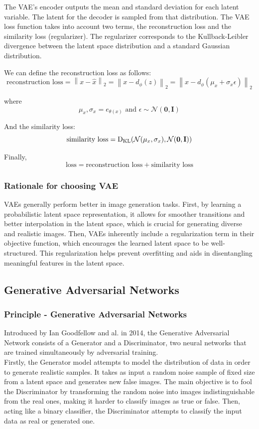 \documentclass{article}
\begin{document}
The VAE's encoder outputs the mean and standard deviation for each latent variable. The latent for the decoder is sampled from that distribution.
The VAE loss function takes into account two terms, the reconstruction loss and the similarity loss (regularizer). 
The regularizer corresponds to the Kullback-Leibler divergence between the latent space distribution and a standard Gaussian distribution.
  
We can define the reconstruction loss as follows:
$$\text{reconstruction loss} = \left\| x -\hat{x}\right\|_{2}=\left\| x-d_{\phi}(z) \right\|_{2}=\left\| x-d_{\phi}(\mu_{x}+\sigma_{x}\epsilon) \right\|_{2}$$

where
$$\mu_{x},\sigma_{x}=e_{\theta(x)} \text{ and } \epsilon\sim\mathcal{N}(\textbf{0},\textbf{I})$$


And the similarity loss:
$$\text{similarity loss}=\mathrm{D}_{\mathrm{KL}}(\mathcal{N}(\mu_{x},\sigma_{x}), \mathcal{N}(\textbf{0},\textbf{I})) \\$$

Finally,
$$\text{loss}=\text{reconstruction loss}+\text{similarity loss}$$

\subsubsection*{Rationale for choosing VAE}
VAEs generally perform better in image generation tasks. 
First, by learning a probabilistic latent space representation, it allows for smoother transitions and better interpolation in the latent space, which is crucial for generating diverse and realistic images. 
Then, VAEs inherently include a regularization term in their objective function, which encourages the learned latent space to be well-structured. 
This regularization helps prevent overfitting and aids in disentangling meaningful features in the latent space.


\subsection{Generative Adversarial Networks}
\subsubsection*{Principle - Generative Adversarial Networks}
\quad Introduced by Ian Goodfellow and al. in 2014, the Generative Adversarial Network consists of a Generator and a Discriminator, two neural networks that are trained simultaneously by adversarial training. \\
Firstly, the Generator model attempts to model the distribution of data in order to generate realistic samples. 
It takes as input a random noise sample of fixed size from a latent space and generates new false images. 
The main objective is to fool the Discriminator by transforming the random noise into images indistinguishable from the real ones, making it harder to classify images as true or false. 
Then, acting like a binary classifier, the Discriminator attempts to classify the input data as real or generated one. \\
\end{document}
